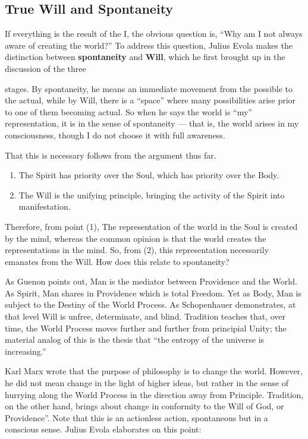 \subsection*{True Will and Spontaneity}

If everything is the result of the I, the obvious question is, ``Why am I not always aware of creating the world?'' To address this question, Julius Evola makes the distinction between \textbf{spontaneity} and \textbf{Will}, which he first brought up in the discussion of the three

stages. By spontaneity, he means an immediate movement from the possible to the actual, while by Will, there is a ``space'' where many possibilities arise prior to one of them becoming actual. So when he says the world is ``my'' representation, it is in the sense of spontaneity --- that is, the world arises in my consciousness, though I do not choose it with full awareness.

That this is necessary follows from the argument thus far.

\begin{enumerate}


\item The Spirit has priority over the Soul, which has priority over the Body.

\item The Will is the unifying principle, bringing the activity of the Spirit into manifestation.
\end{enumerate}


Therefore, from point (1), The representation of the world in the Soul is created by the mind, whereas the common opinion is that the world creates the representations in the mind. So, from (2), this representation necessarily emanates from the Will. How does this relate to spontaneity?

As Guenon points out, Man is the mediator between Providence and the World. As Spirit, Man shares in Providence which is total Freedom. Yet as Body, Man is subject to the Destiny of the World Process. As Schopenhauer demonstrates, at that level Will is unfree, determinate, and blind. Tradition teaches that, over time, the World Process moves further and further from principial Unity; the material analog of this is the thesis that ``the entropy of the universe is increasing.''

Karl Marx wrote that the purpose of philosophy is to change the world. However, he did not mean change in the light of higher ideas, but rather in the sense of hurrying along the World Process in the direction away from Principle. Tradition, on the other hand, brings about change in conformity to the Will of God, or Providence''. Note that this is an actionless action, spontaneous but in a conscious sense. Julius Evola elaborates on this point:

